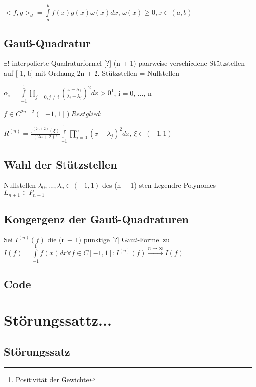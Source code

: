 \documentclass[12pt,a4paper]{article} %
\newcommand*\tab[1][1cm]{\hspace*{#1}}
\begin{document}
	$<f, g>_\omega = \int\limits_a^bf(x)g(x)\omega(x)dx$, \tab $\omega(x)\ge 0, x \in (a, b)$
	
	\subsection{Gauß-Quadratur}
	
	$\exists!$ interpolierte Quadraturformel [?] (n + 1) paarweise verschiedene Stützstellen auf [-1, b] mit Ordnung 2n + 2. Stützstellen = Nullstellen
	
	$\alpha_i = \int\limits_{-1}^1\prod\limits_{j = 0, j \ne i}(\frac{x - \lambda_j}{\lambda_i - \lambda_j})^2 dx > 0$\footnote{Positivität der Gewichte}, \tab i = 0, ..., n
	
	$f\in C^{2n + 2}([-1, 1]) Restglied:$
		
	$R^{(n)} = \frac{f^{(2n + 2)}(\xi)}{(2n + 2)!}\int\limits_{-1}^1\prod\limits_{j = 0}^n(x - \lambda_j)^2dx$, \tab $\xi \in (-1 , 1)$
		
	\subsection{Wahl der Stützstellen}
	
	Nullstellen $\lambda_0, ..., \lambda_n \in(-1, 1)$ des (n + 1)-sten Legendre-Polynomes $L_{n + 1} \in P_{n + 1}$
	
	
	\subsection{Kongergenz der Gauß-Quadraturen}
	
	Sei $I^{(n)}(f)$ die (n + 1) punktige [?] Gauß-Formel zu $I(f) = \int\limits_{-1}^1f(x)dx \forall f \in C[-1, 1]: I^{(n)}(f) \xrightarrow{n \rightarrow \infty} I(f)$
	
	\subsection{Code}
	
	\newpage
	
	\section{Störungssattz...}
	
	\subsection{Störungssatz}
	
\end{document}
